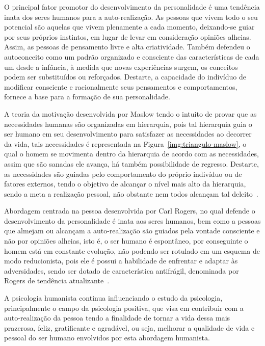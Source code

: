 O principal fator promotor do desenvolvimento da personalidade é uma tendência inata dos seres humanos para a auto-realização. 
As pessoas que vivem todo o seu potencial são aquelas que vivem plenamente a cada momento, deixando-se guiar por seus próprios instintos, em lugar de levar em consideração opiniões alheias. 
Assim, as pessoas de pensamento livre e alta criatividade.
Também defendeu o autoconceito como um padrão organizado e consciente das características de cada um desde a infância, à medida que novas experiências surgem, os conceitos podem ser substituídos ou reforçados. 
Destarte, a capacidade do indivíduo de modificar consciente e racionalmente seus pensamentos e comportamentos, fornece a base para a formação de sua personalidade. 

A teoria da motivação desenvolvida por Maslow tendo o intuito de provar que as necessidades humanas são organizadas em hierarquia, pois tal hierarquia guia o ser humano em seu desenvolvimento para satisfazer as necessidades ao decorrer da vida, tais necessidades é representada na Figura~\ref{img:triangulo-maslow}, o qual o homem se movimenta dentro da hierarquia de acordo com as necessidades, assim que são sanadas ele avança, há também possibilidade de regresso.
Destarte, as necessidades são guiadas pelo comportamento do próprio indivíduo ou de fatores externos, tendo o objetivo de alcançar o nível mais alto da hierarquia, sendo a meta a realização pessoal, não obstante nem todos alcançam tal deleito~\cite{laruse2009geral}.

Abordagem centrada na pessoa desenvolvida por Carl Rogers, no qual defende o desenvolvimento da personalidade é inata aos seres humanos, bem como a pessoas que almejam ou alcançam a auto-realização são guiados pela vontade consciente e não por opiniões alheias, isto é, o ser humano é espontâneo, por conseguinte o homem está em constante evolução, não podendo ser rotulado em um esquema de modo reducionista, pois ele é possui a habilidade de enfrentar e adaptar às adversidades, sendo ser dotado de característica antifrágil, denominada por Rogers de tendência atualizante~\cite{rogers2017pessoa}. 

A psicologia humanista continua influenciando o estudo da psicologia, principalmente o campo da psicologia positiva, que visa em contribuir com a auto-realização da pessoa tendo a finalidade de tornar a vida dessa mais prazerosa, feliz, gratificante e agradável, ou seja, melhorar a qualidade de vida e pessoal do ser humano envolvidos por esta abordagem humanista. 
